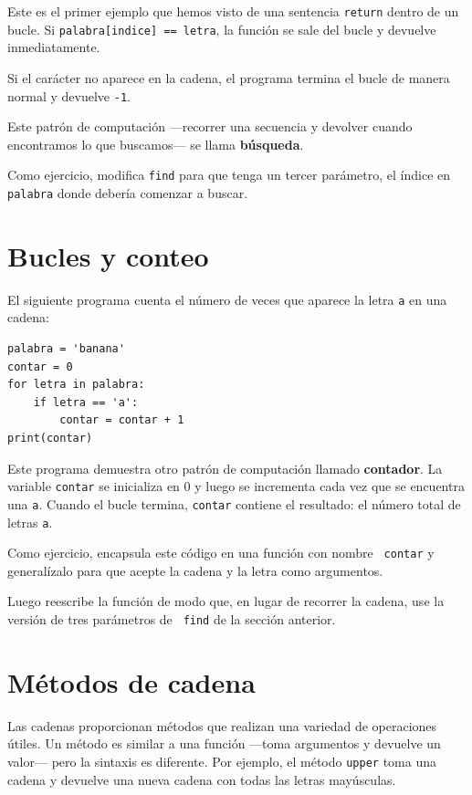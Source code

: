 \documentclass[10pt]{book}
\begin{document}
Este es el primer ejemplo que hemos visto de una sentencia {\tt return}
dentro de un bucle.  Si {\tt palabra[indice] == letra}, la función se sale
del bucle y devuelve inmediatamente.

Si el carácter no aparece en la cadena, el programa
termina el bucle de manera normal y devuelve {\tt -1}.

Este patrón de computación ---recorrer una secuencia y devolver
cuando encontramos lo que buscamos--- se llama {\bf búsqueda}.

Como ejercicio, modifica {\tt find} para que tenga un
tercer parámetro, el índice en {\tt palabra} donde debería comenzar a
buscar.


\section{Bucles y conteo}
\label{counter}

El siguiente programa cuenta el número de veces que aparece la letra {\tt a}
en una cadena:

\begin{verbatim}
palabra = 'banana'
contar = 0
for letra in palabra:
    if letra == 'a':
        contar = contar + 1
print(contar)
\end{verbatim}
%
Este programa demuestra otro patrón de computación llamado {\bf
contador}.  La variable {\tt contar} se inicializa en 0 y luego
se incrementa cada vez que se encuentra una {\tt a}.
Cuando el bucle termina, {\tt contar}
contiene el resultado: el número total de letras {\tt a}.

Como ejercicio, encapsula este código en una función con nombre {\tt
contar} y generalízalo para que acepte la cadena y la
letra como argumentos.

Luego reescribe la función de modo que, en lugar de
recorrer la cadena, use la versión de tres parámetros de {\tt
find} de la sección anterior.


\section{Métodos de cadena}
\label{optional}

Las cadenas proporcionan métodos que realizan una variedad de operaciones útiles.
Un método es similar a una función ---toma argumentos y
devuelve un valor--- pero la sintaxis es diferente.  Por ejemplo, el
método {\tt upper} toma una cadena y devuelve una nueva cadena con
todas las letras mayúsculas.
\end{document}
